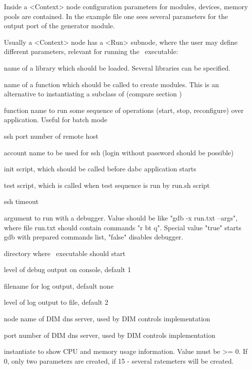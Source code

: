 Inside a <Context> node configuration parameters for modules, devices, memory pools are
contained.
In the example file one sees several parameters for the output port of 
the generator module.  

Usually a <Context> node has a <Run> subnode, where the user may define different parameters, relevant for running the \dabc\ executable:

\bdes
\item[lib] name of a library which should be loaded. Several libraries can be specified.
\item[func] name of a function which should be called to create modules. 
This is an alternative to instantiating a subclass of  
(compare section )
\item[runfunc] function name to run some sequence of operations (start, stop, reconfigure) over application. Useful
for batch mode                 
\item[port] ssh port number of remote host
\item[user] account name to be used for ssh (login without password should be possible)
\item[init] init script, which should be called before dabc application starts
\item[test] test script, which is called when test sequence is run by run.sh script
\item[timeout] ssh timeout 
\item[debugger] argument to run with a debugger. Value should be like "gdb -x run.txt --args", where file run.txt should contain commands "r bt q". Special value "true" starts gdb with prepared commands list, "false" disables debugger.
\item[workdir] directory where \dabc\ executable should start
\item[debuglevel] level of debug output on console, default 1
\item[logfile] filename for log output, default none  
\item[loglevel] level of log output to file, default 2 
\item[DIM\_DNS\_NODE] node name of DIM dns server, used by DIM controls implementation 
\item[DIM\_DNS\_PORT] port number of DIM dns server, used by DIM controls implementation
\item[cpuinfo] instantiate  to show CPU and memory usage information. 
Value must be >= 0. If 0, only two parameters are created, if 15 - several ratemeters will be created.    
\edes

